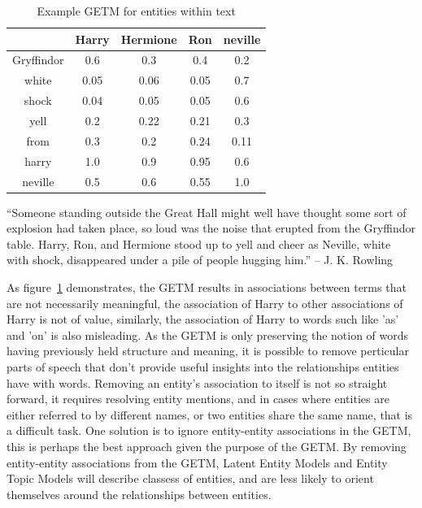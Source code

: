 \documentclass[10pt]{report}
\begin{document}
\begin{table}[h!]
  \centering
    \begin{tabular}{c | c c c c}
     &Harry&Hermione&Ron&neville\\
      \hline
      Gryffindor    & 0.6  & 0.3   & 0.4  & 0.2  \\
      white         & 0.05 & 0.06  & 0.05 & 0.7  \\
      shock         & 0.04 & 0.05  & 0.05 & 0.6  \\
      yell          & 0.2  & 0.22  & 0.21 & 0.3  \\
      from          & 0.3  & 0.2   & 0.24 & 0.11 \\
      harry         & 1.0  & 0.9   & 0.95 & 0.6  \\
      neville       & 0.5  & 0.6   & 0.55 & 1.0
    \end{tabular}
  \begin{displayquote}
 ``Someone standing outside the Great Hall might well have thought some
sort of explosion had taken place, so loud was the noise that erupted
from the Gryffindor table. Harry, Ron, and Hermione stood up to yell and
cheer as Neville, white with shock, disappeared under a pile of people
hugging him.'' -- J. K. Rowling
    \end{displayquote}
  \caption{ Example GETM for entities within text \label{fig:getm_example}}
\end{table}

\newpage
As figure~\ref{fig:getm_example} demonstrates, the GETM results in associations between terms that are not necessarily meaningful, the association of Harry to other associations of Harry is not of value, similarly, the association of Harry to words such like 'as' and 'on' is also misleading. As the GETM is only preserving the notion of words having previously held structure and meaning, it is possible to remove perticular parts of speech that don't provide useful insights into the relationships entities have with words. Removing an entity's association to itself is not so straight forward, it requires resolving entity mentions, and in cases where entities are either referred to by different names, or two entities share the same name, that is a difficult task. One solution is to ignore entity-entity associations in the GETM, this is perhaps the best approach given the purpose of the GETM. By removing entity-entity associations from the GETM, Latent Entity Models and Entity Topic Models will describe classess of entities, and are less likely to orient themselves around the relationships between entities.
\end{document}
